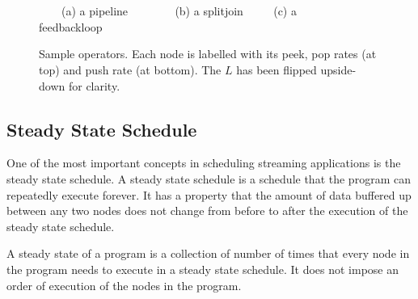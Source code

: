 \begin{figure}
\begin{center}

\begin{minipage}{0.7in}
\centering {}
\end{minipage}
~~~~~~
\begin{minipage}{0.8in}
\centering {}
\end{minipage}
~~~~~~
\begin{minipage}{0.8in}
\centering {}
\end{minipage}

\vspace{0.1in}

{\small ~~~~(a) a pipeline ~~~~~~~ (b) a splitjoin ~~~~ (c) a feedbackloop~~~~}

\caption{\small Sample {\StreamIt} operators.  Each node is labelled
with its peek, pop rates (at top) and push rate (at bottom).  The $L$
{\filter} has been flipped upside-down for clarity.
\label{fig:steady-state}}
\end{center}
\end{figure}

\subsection{Steady State Schedule}
\label{sec:steady-state}

One of the most important concepts in scheduling streaming
applications is the steady state schedule.  A steady state schedule is
a schedule that the program can repeatedly execute forever.  It has a
property that the amount of data buffered up between any two nodes
does not change from before to after the execution of the steady state
schedule.

A steady state of a program is a collection of number of times that
every node in the program needs to execute in a steady state schedule.
It does not impose an order of execution of the nodes in the program.
\begin{comment}
Not every {\StreamIt} program has a steady state schedule.  It is
possible for a program to have unbalanced production and
consumption of data in {\splitjoins} and {\feedbackloops}. The
amount of data buffered continually increases, and cannot be
reduced, thus making it impossible to create a steady state
schedule for them.  It is also possible that a {\feedbackloop}
does not have enough data buffered up internally in order to
complete execution of a full steady state, and thus deadlocks.
Programs without a valid steady state schedule are not considered
valid {\StreamIt} programs. In other words, all valid {\StreamIt}
programs have a steady state schedule.
\end{comment}

